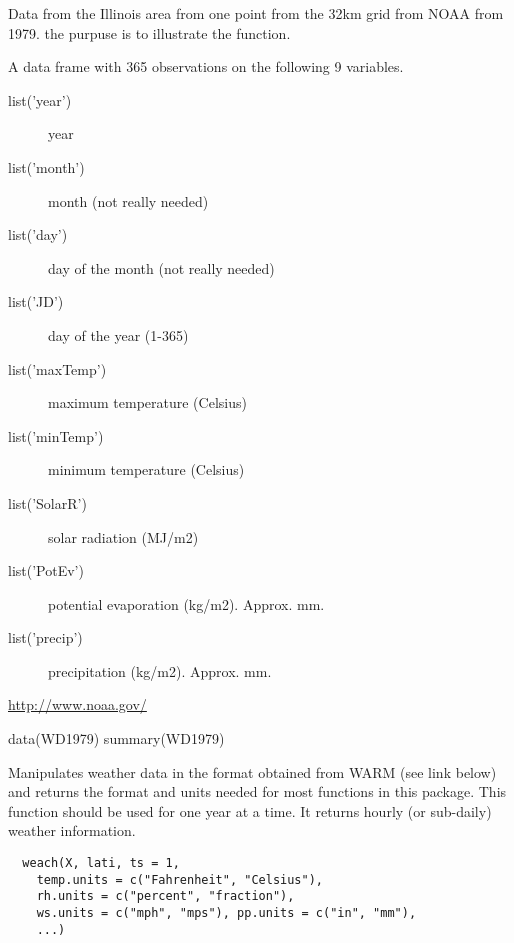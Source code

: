 \documentclass[letterpaper]{book}
\begin{document}
%
\begin{Description}\relax
Data from the Illinois area from one point from the 32km
grid from NOAA from 1979. the purpuse is to illustrate
the  function.
\end{Description}
%
\begin{Format}
A data frame with 365 observations on the following 9 variables.
\begin{description}
 \item[list('year')] year\item[list('month')] month (not really
needed)\item[list('day')] day of the month (not really needed)
\item[list('JD')] day of the year (1-365)\item[list('maxTemp')] maximum
temperature (Celsius)\item[list('minTemp')] minimum temperature
(Celsius)\item[list('SolarR')] solar radiation (MJ/m2)
\item[list('PotEv')] potential evaporation (kg/m2). Approx. mm.
\item[list('precip')] precipitation (kg/m2). Approx. mm.
\end{description}
\end{Format}
%
\begin{Source}\relax
\url{http://www.noaa.gov/}
\end{Source}
%
\begin{Examples}
\begin{ExampleCode}
data(WD1979)
summary(WD1979)
\end{ExampleCode}
\end{Examples}
%
\begin{Description}\relax
Manipulates weather data in the format obtained from WARM
(see link below) and returns the format and units needed
for most functions in this package. This function should
be used for one year at a time.  It returns hourly (or
sub-daily) weather information.
\end{Description}
%
\begin{Usage}
\begin{verbatim}
  weach(X, lati, ts = 1,
    temp.units = c("Fahrenheit", "Celsius"),
    rh.units = c("percent", "fraction"),
    ws.units = c("mph", "mps"), pp.units = c("in", "mm"),
    ...)
\end{verbatim}
\end{Usage}
\end{document}
